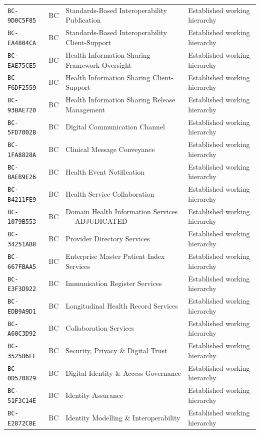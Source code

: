 \documentclass[11pt,a4paper,openany]{book}
\begin{document}
\begin{longtable}{@{}p{.19\linewidth}p{.12\linewidth}p{.39\linewidth}p{.24\linewidth}@{}}
\texttt{BC-9D0C5F85} & BC & Standards-Based Interoperability Publication & Established working hierarchy \\
\texttt{BC-EA4804CA} & BC & Standards-Based Interoperability Client-Support & Established working hierarchy \\
\texttt{BC-EAE75CE5} & BC & Health Information Sharing Framework Oversight & Established working hierarchy \\
\texttt{BC-F6DF2559} & BC & Health Information Sharing Client-Support & Established working hierarchy \\
\texttt{BC-93BAE720} & BC & Health Information Sharing Release Management & Established working hierarchy \\
\texttt{BC-5FD7002B} & BC & Digital Communication Channel & Established working hierarchy \\
\texttt{BC-1FA8828A} & BC & Clinical Message Conveyance & Established working hierarchy \\
\texttt{BC-BAEB9E26} & BC & Health Event Notification & Established working hierarchy \\
\texttt{BC-B4211FE9} & BC & Health Service Collaboration & Established working hierarchy \\
\texttt{BC-1079B553} & BC & Domain Health Information Services — ADJUDICATED & Established working hierarchy \\
\texttt{BC-34251AB8} & BC & Provider Directory Services & Established working hierarchy \\
\texttt{BC-667FBAA5} & BC & Enterprise Master Patient Index Services & Established working hierarchy \\
\texttt{BC-E3F3D922} & BC & Immunisation Register Services & Established working hierarchy \\
\texttt{BC-EDB9A9D1} & BC & Longitudinal Health Record Services & Established working hierarchy \\
\texttt{BC-A60C3D92} & BC & Collaboration Services & Established working hierarchy \\
\texttt{BC-3525B6FE} & BC & Security, Privacy \& Digital Trust & Established working hierarchy \\
\texttt{BC-0D570829} & BC & Digital Identity \& Access Governance & Established working hierarchy \\
\texttt{BC-51F3C14E} & BC & Identity Assurance & Established working hierarchy \\
\texttt{BC-E2872CBE} & BC & Identity Modelling \& Interoperability & Established working hierarchy \\

\end{longtable}
\end{document}
